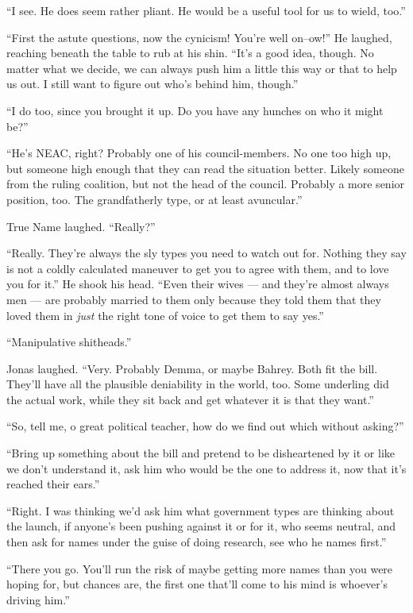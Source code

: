 ``I see. He does seem rather pliant. He would be a useful tool for us to wield, too.''

``First the astute questions, now the cynicism! You're well on--ow!'' He laughed, reaching beneath the table to rub at his shin. ``It's a good idea, though. No matter what we decide, we can always push him a little this way or that to help us out. I still want to figure out who's behind him, though.''

``I do too, since you brought it up. Do you have any hunches on who it might be?''

``He's NEAC, right? Probably one of his council-members. No one too high up, but someone high enough that they can read the situation better. Likely someone from the ruling coalition, but not the head of the council. Probably a more senior position, too. The grandfatherly type, or at least avuncular.''

True Name laughed. ``Really?''

``Really. They're always the sly types you need to watch out for. Nothing they say is not a coldly calculated maneuver to get you to agree with them, and to love you for it.'' He shook his head. ``Even their wives — and they're almost always men — are probably married to them only because they told them that they loved them in \emph{just} the right tone of voice to get them to say yes.''

``Manipulative shitheads.''

Jonas laughed. ``Very. Probably Demma, or maybe Bahrey. Both fit the bill. They'll have all the plausible deniability in the world, too. Some underling did the actual work, while they sit back and get whatever it is that they want.''

``So, tell me, o great political teacher, how do we find out which without asking?''

``Bring up something about the bill and pretend to be disheartened by it or like we don't understand it, ask him who would be the one to address it, now that it's reached their ears.''

``Right. I was thinking we'd ask him what government types are thinking about the launch, if anyone's been pushing against it or for it, who seems neutral, and then ask for names under the guise of doing research, see who he names first.''

``There you go. You'll run the risk of maybe getting more names than you were hoping for, but chances are, the first one that'll come to his mind is whoever's driving him.''

